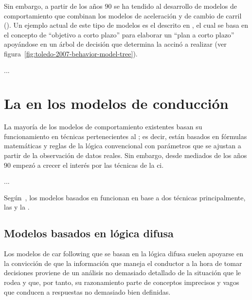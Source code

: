 Sin embargo, a partir de los años $90$ se ha tendido al desarrollo de modelos de comportamiento que combinan los modelos de aceleración y de cambio de carril (\cite{Ma2004}). Un ejemplo actual de este tipo de modelos es el descrito en \cite{Toledo2007}, el cual se basa en el concepto de \enquote{objetivo a corto plazo} para elaborar un \enquote{plan a corto plazo} apoyándose en un árbol de decisión que determina la accinó a realizar (ver figura~\ref{fig:toledo-2007-behavior-model-tree}).

...

\section{La  en los modelos de conducción}

La mayoría de los modelos de comportamiento existentes basan su funcionamiento en técnicas pertenecientes al ; es decir, están basados en fórmulas matemáticas y reglas de la lógica convencional con parámetros que se ajustan a partir de la observación de datos reales. Sin embargo, desde mediados de los años $90$ empezó a crecer el interés por las técnicas de la \gls{ci}.

...

Según~\cite{Aghabayk2015}, los modelos basados en  funcionan en base a dos técnicas principalmente, las  y la .

\subsection{Modelos basados en lógica difusa}

Los modelos de car following que se basan en la lógica difusa suelen apoyarse en la convicción de que la información que maneja el conductor a la hora de tomar decisiones proviene de un análisis no demasiado detallado de la situación que le rodea y que, por tanto, su razonamiento parte de conceptos imprecisos y vagos que conducen a respuestas no demasiado bien definidas.

